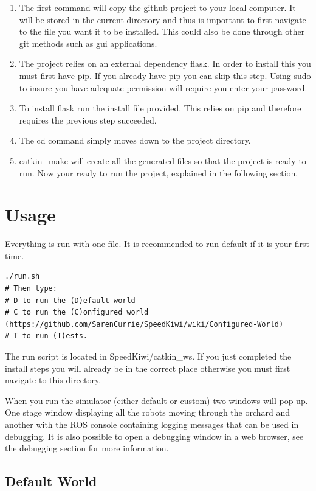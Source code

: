 \documentclass{article}
\begin{document}
\begin{enumerate}
\item The first command will copy the github project to your local computer. It will be stored in the current directory and thus is important to first navigate to the file you want it to be installed. This could also be done through other git methods such as gui applications.
\item The project relies on an external dependency flask. In order to install this you must first have pip. If you already have pip you can skip this step. Using sudo to insure you have adequate permission will require you enter your password.
\item To install flask run the install file provided. This relies on pip and therefore requires the previous step succeeded.
\item The cd command simply moves down to the project directory.
\item catkin\_make will create all the generated files so that the project is ready to run.
Now your ready to run the project, explained in the following section.
\end{enumerate}

\section{Usage}
Everything is run with one file. It is recommended to run default if it is your first time.

\begin{verbatim}
./run.sh
# Then type: 
# D to run the (D)efault world
# C to run the (C)onfigured world (https://github.com/SarenCurrie/SpeedKiwi/wiki/Configured-World) 
# T to run (T)ests.
\end{verbatim}

The run script is located in SpeedKiwi/catkin\_ws. If you just completed the install steps you will already be in the correct place otherwise you must first navigate to this directory.

When you run the simulator (either default or custom) two windows will pop up. One stage window displaying all the robots moving through the orchard and another with the ROS console containing logging messages that can be used in debugging.
It is also possible to open a debugging window in a web browser, see the debugging section for more information.

\subsection{Default World}
\end{document}

